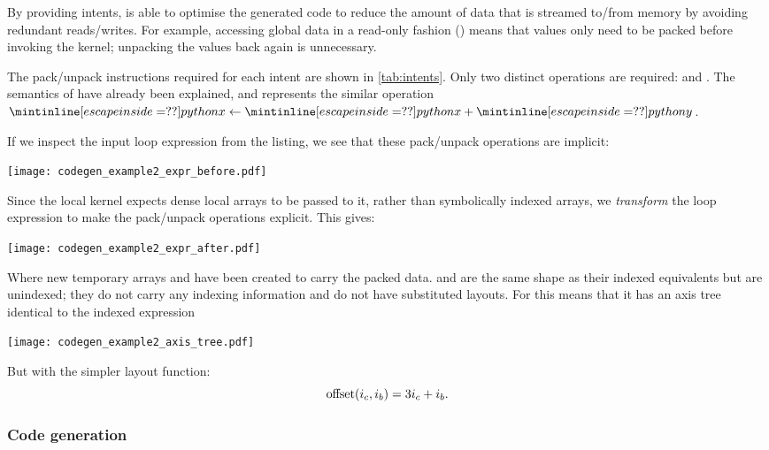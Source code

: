 \documentclass[thesis]{subfiles}
\begin{document}
By providing intents,  is able to optimise the generated code to reduce the amount of data that is streamed to/from memory by avoiding redundant reads/writes.
For example, accessing global data in a read-only fashion () means that values only need to be packed before invoking the kernel; unpacking the values back again is unnecessary.

The pack/unpack instructions required for each intent are shown in \cref{tab:intents}.
Only two distinct operations are required:  and .
The semantics of  have already been explained, and  represents the similar operation $\pycode{x} \gets \pycode{x} + \pycode{y}$.

If we inspect the input loop expression from the listing, we see that these pack/unpack operations are implicit:
\begin{center}
  \texttt{[image: codegen\_example2\_expr\_before.pdf]}
\end{center}
Since the local kernel expects dense local arrays to be passed to it, rather than symbolically indexed arrays, we \emph{transform} the loop expression to make the pack/unpack operations explicit.
This gives:
\begin{center}
  \texttt{[image: codegen\_example2\_expr\_after.pdf]}
\end{center}
Where new temporary arrays  and  have been created to carry the packed data.
 and  are the same shape as their indexed equivalents but are unindexed; they do not carry any indexing information and do not have substituted layouts.
For  this means that it has an axis tree identical to the indexed expression 
\begin{center}
  \texttt{[image: codegen\_example2\_axis\_tree.pdf]}
\end{center}
But with the simpler layout function:
\begin{equation}
  \textnormal{offset}(i_c, i_b) = 3 i_c + i_b.
  \label{eq:temporary_layout}
\end{equation}

\subsubsection{Code generation}
\end{document}

